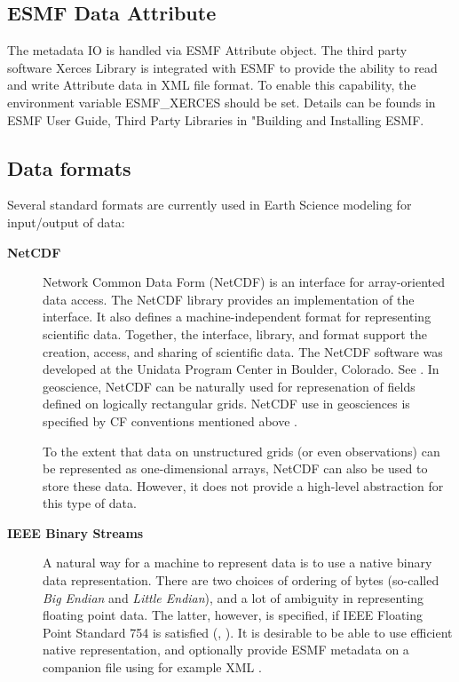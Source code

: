 \subsection{ESMF Data Attribute}

The metadata IO is handled via ESMF Attribute object. The third
party software Xerces Library is integrated with ESMF to provide
the ability to read and write Attribute data in XML file format.
To enable this capability, the environment variable ESMF\_XERCES should be
set. Details can be founds in ESMF User Guide, Third Party Libraries
in "Building and Installing ESMF.


\subsection{Data formats}

Several standard formats are currently used in Earth Science modeling
for input/output of data:

\begin{description}
\item[\bf NetCDF] Network Common Data Form (NetCDF) is an interface for 
array-oriented data access. The NetCDF library provides an
implementation of the interface. It also defines a 
machine-independent format for representing scientific data. Together,
the interface, library, and format support the creation, access, and
sharing of scientific data. The NetCDF software was developed at the
Unidata Program Center in Boulder, Colorado. See \cite{NetCDF3_UsersGuide_C}.
In geoscience, NetCDF can be naturally used for represenation of fields 
defined on logically rectangular grids. NetCDF use in geosciences is 
specified by CF conventions mentioned above \cite{NetCDF_CF_v1_beta3}. 

To the extent that data on unstructured grids (or even observations) can be 
represented as one-dimensional arrays, NetCDF can also be used to store these 
data. However, it does not provide a high-level abstraction for this type of 
data. 

\item[\bf IEEE Binary Streams]
A natural way for a machine to represent data is to use a native
binary data representation. There are two choices of ordering of bytes
(so-called {\it Big Endian} and {\it Little Endian}), and a lot of
ambiguity in representing floating point data. The latter, however, is
specified, if IEEE Floating Point Standard 754 is satisfied
(\cite{IEEE-Floating-Point}, \cite{Kahan-IEEE-754}). It is desirable
to be able to use efficient native representation, and optionally
provide ESMF metadata on a companion file using for example XML
\cite{XML-W3C}.

\end{description}

